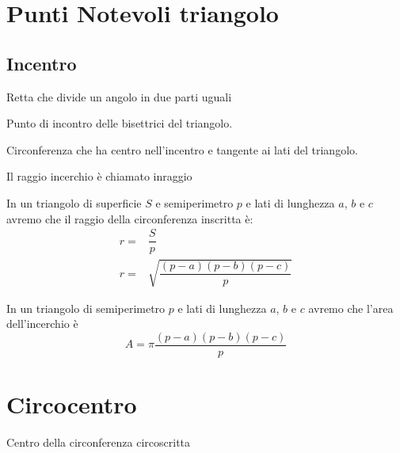 \section{Punti Notevoli triangolo}
\subsection{Incentro}
\begin{defn}[Bisettrice]
Retta che divide un angolo in due parti uguali
\end{defn}
\begin{defn}[Incentro]
Punto di incontro delle bisettrici del triangolo.
\end{defn}
\begin{defn}[Incerchio]
Circonferenza che ha centro nell'incentro e tangente ai lati del triangolo.
\end{defn}
{\centering
	
	\par}
\begin{defn}[Inraggio]
	Il raggio incerchio è chiamato inraggio
\end{defn}
\begin{thm}[Inraggio]
	In un triangolo di superficie $S$ e semiperimetro $p$ e lati di lunghezza $a$, $b$ e $c$ avremo che il raggio della circonferenza inscritta è:
	\begin{align*}
r=&\dfrac{S}{p}\\
r=&\sqrt{\dfrac{(p-a)(p-b)(p-c)}{p}}
	\end{align*}
\end{thm}
{\centering
	
	\par}
\begin{thm}
	In un triangolo di semiperimetro $p$ e lati di lunghezza $a$, $b$ e $c$ avremo che l'area dell'incerchio è
	\[ A=\pi\dfrac{(p-a)(p-b)(p-c)}{p}\]
\end{thm}
\section{Circocentro}
\begin{defn}[Circocentro]
	Centro della circonferenza circoscritta
\end{defn}
{\centering
	
	\par}